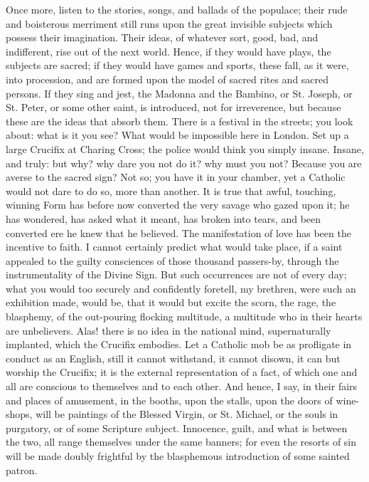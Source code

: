 Once more, listen to the stories, songs, and ballads of the
populace; their rude and boisterous merriment still runs upon the
great invisible subjects which possess their imagination. Their ideas,
of whatever sort, good, bad, and indifferent, rise out of the next
world. Hence, if they would have plays, the subjects are sacred; if
they would have games and sports, these fall, as it were, into
procession, and are formed upon the model of sacred rites and sacred
persons. If they sing and jest, the Madonna and the Bambino, or St.
Joseph, or St. Peter, or some other saint, is introduced, not for
irreverence, but because these are the ideas that absorb them. There
is a festival in the streets; you look about: what is it you see? What
would be impossible here in London. Set up a large Crucifix at Charing
Cross; the police would think you simply insane. Insane, and truly:
but why? why dare you not do it? why must you not? Because you are
averse to the sacred sign? Not so; you have it in your chamber, yet a
Catholic would not dare to do so, more than another. It is true that
awful, touching, winning Form has before now converted the very savage
who gazed upon it; he has wondered, has asked what it meant, has
broken into tears, and been converted ere he knew that he believed.
The manifestation of love has been the incentive to faith. I cannot
certainly predict what would take place, if a saint appealed to the
guilty consciences of those thousand passers-by, through the
instrumentality of the Divine Sign. But such occurrences are not of
every day; what you would too securely and confidently foretell, my
brethren, were such an exhibition made, would be, that it would but
excite the scorn, the rage, the blasphemy, of the out-pouring flocking
multitude, a multitude who in their hearts are unbelievers. Alas!
there is no idea in the national mind, supernaturally implanted, which
the Crucifix embodies. Let a Catholic mob be as profligate in conduct
as an English, still it cannot withstand, it cannot disown, it can but
worship the Crucifix; it is the external representation of a fact, of
which one and all are conscious to themselves and to each other. And
hence, I say, in their fairs and places of amusement, in the booths,
upon the stalls, upon the doors of wine-shops, will be paintings of
the Blessed Virgin, or St. Michael, or the souls in purgatory, or of
some Scripture subject. Innocence, guilt, and what is between the two,
all range themselves under the same banners; for even the resorts of
sin will be made doubly frightful by the blasphemous introduction of
some sainted patron.

